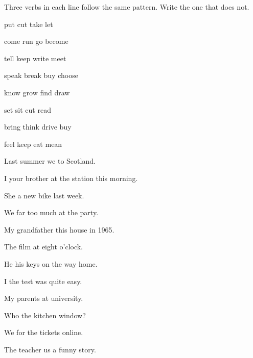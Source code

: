 \documentclass[11pt]{article}
\begin{document}
\clearpage


%
  {Three verbs in each line follow the same pattern. Write the one that
   does not.}

\begin{gapexercise}
  \item put \quad cut \quad take \quad let          \hfill {}
  \item come \quad run \quad go \quad become        \hfill {}
  \item tell \quad keep \quad write \quad meet      \hfill {}
  \item speak \quad break \quad buy \quad choose    \hfill {}
  \item know \quad grow \quad find \quad draw       \hfill {}
  \item set \quad sit \quad cut \quad read          \hfill {}
  \item bring \quad think \quad drive \quad buy     \hfill {}
  \item feel \quad keep \quad eat \quad mean        \hfill {}
\end{gapexercise}


\begin{gapexercise}
  \item Last summer we  to Scotland.
  \item I  your brother at the station this morning.
  \item She  a new bike last week.
  \item We  far too much at the party.
  \item My grandfather  this house in 1965.
  \item The film  at eight o'clock.
  \item He  his keys on the way home.
  \item I  the test was quite easy.
  \item My parents  at university.
  \item Who  the kitchen window?
  \item We  for the tickets online.
  \item The teacher  us a funny story.
\end{gapexercise}
\end{document}
